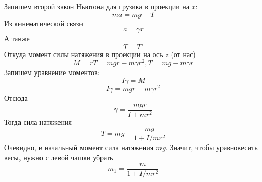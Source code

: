 \documentclass[a5paper,10pt]{article}
\begin{document}
Запишем второй закон Ньютона для грузика в проекции на $x$:
\begin{equation}
	ma=mg-T
\end{equation}
Из кинематической связи
\begin{equation}
	a=\gamma r
\end{equation}
А также
\begin{equation}
	T=T'
\end{equation}
Откуда момент силы натяжения в проекции на ось $z$ (от нас)
\begin{equation}
	M=rT=mgr-m\gamma r^2, 
	T=mg-m\gamma r
\end{equation}
Запишем уравнение моментов:
\begin{equation}
	I\gamma=M
\end{equation}
\begin{equation}
	I\gamma=mgr-m\gamma r^2
\end{equation}
Отсюда
\begin{equation}
	\gamma=\frac{mgr}{I+mr^2}
\end{equation}
Тогда сила натяжения
\begin{equation}
	T=mg-\frac{mg}{1+I/mr^2}
\end{equation}
Очевидно, в начальный момент сила натяжения $mg$. Значит, чтобы уравновесить весы, нужно с левой чашки убрать
\begin{equation}
	m_1=\frac{m}{1+I/mr^2}
\end{equation}
\end{document}
